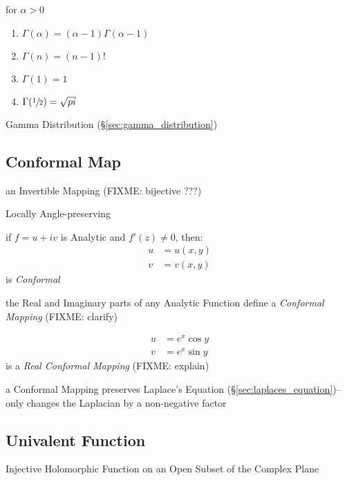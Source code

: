 for $\alpha > 0$

\begin{enumerate}
\item $\Gamma(\alpha) = (\alpha - 1) \Gamma(\alpha -1)$
\item $\Gamma(n) = (n-1)!$
\item $\Gamma(1) = 1$
\item $\Gamma(\sfrac{1}{2}) = \sqrt{pi}$
\end{enumerate}

Gamma Distribution (\S\ref{sec:gamma_distribution})



\subsection{Conformal Map}\label{sec:conformal_map}

an Invertible Mapping (FIXME: bijective ???)

Locally Angle-preserving

if $f = u + iv$ is Analytic and $f'(z) \neq 0$, then:
\begin{align*}
  u & = u(x,y) \\
  v & = v(x,y)
\end{align*}
is \emph{Conformal}

the Real and Imaginary parts of any Analytic Function define a \emph{Conformal
  Mapping} (FIXME: clarify)

\begin{align*}
  u & = e^x \cos y \\
  v & = e^x \sin y
\end{align*}
is a \emph{Real Conformal Mapping} (FIXME: explain)

a Conformal Mapping preserves Laplace's Equation
(\S\ref{sec:laplaces_equation})-- only changes the Laplacian by a non-negative
factor



\subsection{Univalent Function}\label{sec:univalent_function}

Injective Holomorphic Function on an Open Subset of the Complex Plane



